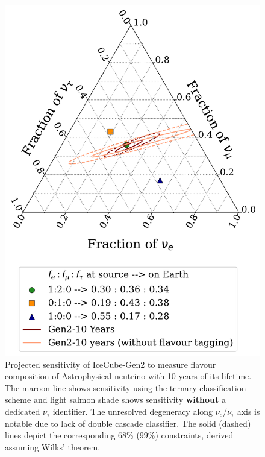 \begin{figure}[h!]
    
    \caption[Sensitivity of IceCube-Gen2 to measure flavour composition of Astrophysical neutrino with 10 years of its lifetime]{Projected sensitivity of IceCube-Gen2 to measure flavour composition of Astrophysical neutrino with 10 years of its lifetime. The maroon line shows sensitivity using the ternary classification scheme and light salmon shade shows sensitivity \textbf{without} a dedicated $\nu_{\tau}$ identifier. The unresolved degeneracy along $\nu_e$/$\nu_{\tau}$ axis is notable due to lack of double cascade classifier. The solid (dashed) lines depict the corresponding 68\% (99\%) constraints, derived assuming Wilks' theorem.}
    \includegraphics{./figures/gen2/Gen2-10Years.pdf}
    
\end{figure}


